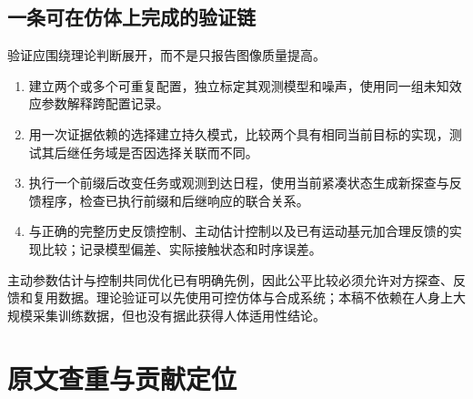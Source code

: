 \documentclass[UTF8,fontset=fandol,11pt,a4paper]{ctexart}
\theoremstyle{definition}
\theoremstyle{remark}
\numberwithin{equation}{section}
\begin{document}
\subsection{一条可在仿体上完成的验证链}
验证应围绕理论判断展开，而不是只报告图像质量提高。
\begin{enumerate}
\item 建立两个或多个可重复配置，独立标定其观测模型和噪声，使用同一组未知效应参数解释跨配置记录。
\item 用一次证据依赖的选择建立持久模式，比较两个具有相同当前目标的实现，测试其后继任务域是否因选择关联而不同。
\item 执行一个前缀后改变任务或观测到达日程，使用当前紧凑状态生成新探查与反馈程序，检查已执行前缀和后继响应的联合关系。
\item 与正确的完整历史反馈控制、主动估计控制以及已有运动基元加合理反馈的实现比较；记录模型偏差、实际接触状态和时序误差。
\end{enumerate}
主动参数估计与控制共同优化已有明确先例\cite{dual}，因此公平比较必须允许对方探查、反馈和复用数据。理论验证可以先使用可控仿体与合成系统；本稿不依赖在人身上大规模采集训练数据，但也没有据此获得人体适用性结论。

\section{原文查重与贡献定位}
\label{sec:related}
\end{document}
